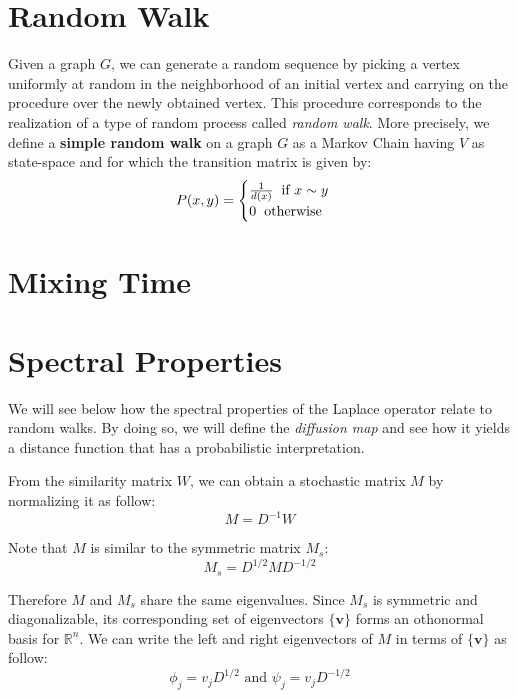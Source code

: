 \documentclass[12pt, oneside, extrafontsizes]{memoir}  %
\theoremstyle{plain}
\theoremstyle{definition}
\begin{document}
\section{Random Walk}
Given a graph $G$, we can generate a random sequence by picking a vertex uniformly at random in the neighborhood of an initial vertex and carrying on the procedure over the newly obtained vertex. This procedure corresponds to the realization of a type of random process called \textit{random walk}. More precisely, we define a \textbf{simple random walk} on a graph $G$ as a Markov Chain having $V$ as state-space and for which the transition matrix is given by:
\begin{equation}
P(x, y) = \begin{cases} 
\frac{1}{d(x)} \hspace{2mm} \mbox{if $x \sim y$} \\
0 \hspace{2mm} \mbox{otherwise}
\end{cases}
\end{equation}

\section{Mixing Time}

\section{Spectral Properties}
We will see below how the spectral properties of the Laplace operator relate to random walks. By doing so, we will define the \textit{diffusion map} and see how it yields a distance function that has a probabilistic interpretation.

From the similarity matrix $W$, we can obtain a stochastic matrix $M$ by normalizing it as follow:
\begin{equation}
M = D^{-1}W
\end{equation}

Note that $M$ is similar to the symmetric matrix $M_s$:
\begin{equation}
M_s = D^{1/2} M D^{-1/2}
\end{equation}

Therefore $M$ and $M_s$ share the same eigenvalues. Since $M_s$ is symmetric and diagonalizable, its corresponding set of eigenvectors $\{\mathbf{v}\}$ forms an othonormal basis for $\mathbb{R}^n$. We can write the left and right eigenvectors of $M$ in terms of  $\{\mathbf{v}\}$ as follow:
\begin{equation}
\phi_j = v_j D^{1/2} \mbox{ and } \psi_j = v_j D^{-1/2}
\end{equation}
\end{document}
